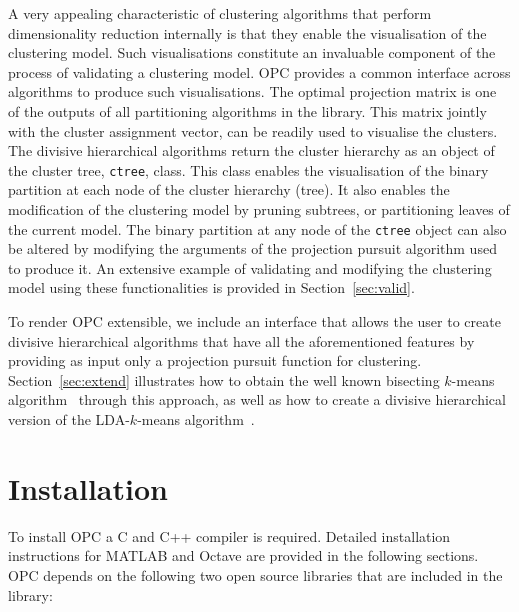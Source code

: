 \documentclass{book}
\begin{document}
A very appealing characteristic of clustering algorithms that perform
dimensionality reduction internally is that they enable the visualisation of
the clustering model. 
%
Such visualisations constitute an invaluable component of the process of
validating a clustering model.  OPC provides a common interface across
algorithms to produce such visualisations.
%
The optimal
projection matrix is one of the outputs of all partitioning algorithms in the
library. This matrix jointly with the cluster assignment vector, can be readily
used to visualise the clusters.
%
The divisive hierarchical algorithms return the cluster hierarchy as an object
of the cluster tree, {\tt ctree}, class.
%
This class enables the visualisation of the binary partition at each
node of the cluster hierarchy (tree). 
%
%
It also enables the modification of the clustering model by pruning subtrees,
or partitioning leaves of the current model.
%
The binary partition at any node of the {\tt ctree} object can also be altered
by modifying the arguments of the projection pursuit algorithm used to produce
it. An extensive example of validating and modifying the clustering model
using these functionalities is 
provided in Section~\ref{sec:valid}.


To render OPC extensible, we include an interface that allows the user to
create divisive hierarchical algorithms that have all the aforementioned
features by providing as input only a projection pursuit function for
clustering. Section~\ref{sec:extend} illustrates how to obtain the well known
bisecting $k$-means algorithm~\cite{SteinbachKK2000} through this approach,
as well as how to create a divisive hierarchical version of the
LDA-$k$-means algorithm~\cite{DingL2007}.



\chapter{Installation}

To install OPC a C and C++ compiler is required. Detailed installation
instructions for MATLAB and Octave are provided in the following sections.
%
OPC depends on the following two open source
libraries that are included in the library:
\end{document}
